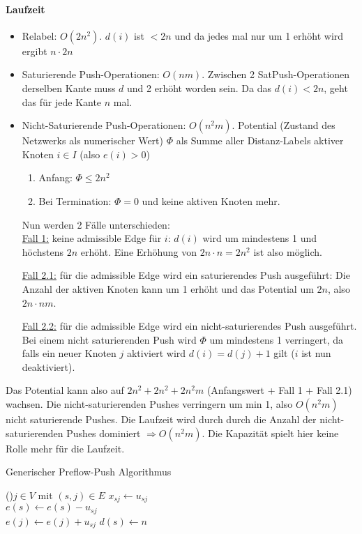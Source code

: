 \paragraph{Laufzeit}
\begin{itemize}
 \item Relabel: $O(2n^2)$. $d(i)$ ist $< 2n$ und da jedes mal nur um 1 erhöht wird ergibt $n \cdot 2n$
 \item Saturierende Push-Operationen: $O(nm)$. Zwischen 2 SatPush-Operationen derselben Kante muss $d$ und 2 erhöht worden sein. Da das $d(i) < 2n$, geht das für jede Kante $n$ mal.
 \item Nicht-Saturierende Push-Operationen: $O(n^2m)$. Potential (Zustand des Netzwerks als numerischer Wert) $\Phi$ als Summe aller Distanz-Labels aktiver Knoten $i\in I$ (also $e(i)>0$)
 \begin{enumerate}
  \item Anfang: $\Phi \leq 2n^2$
  \item Bei Termination: $\Phi = 0$ und keine aktiven Knoten mehr.
 \end{enumerate}
 Nun werden 2 Fälle unterschieden:\\
 \underline{Fall 1:} keine admissible Edge für $i$: $d(i)$ wird um mindestens 1 und höchstens $2n$ erhöht. Eine Erhöhung von $2n \cdot n = 2n^2$ ist also möglich.
 
 
 \underline{Fall 2.1:} für die admissible Edge wird ein saturierendes Push ausgeführt: Die Anzahl der aktiven Knoten kann um 1 erhöht und das Potential um $2n$, also $2n \cdot nm$.
 
 
 \underline{Fall 2.2:} für die admissible Edge wird ein nicht-saturierendes Push ausgeführt. Bei einem nicht saturierenden Push wird $\Phi$ um mindestens 1 verringert, da falls ein neuer Knoten $j$ aktiviert wird $d(i) = d(j) + 1$ gilt ($i$ ist nun deaktiviert).
 
\end{itemize}
Das Potential kann also auf $2n^2 + 2n^2 + 2n^2m$ (Anfangswert + Fall 1 + Fall 2.1) wachsen. Die nicht-saturierenden Pushes verringern um min 1, also $O(n^2m)$ nicht saturierende Pushes.
Die Laufzeit wird durch durch die Anzahl der nicht-saturierenden Pushes dominiert $\Rightarrow O(n^2m)$. Die Kapazität spielt hier keine Rolle mehr für die Laufzeit.

\begin{algorithm}
 \caption{Generischer Preflow-Push Algorithmus}
 \For(){$j\in V$ mit $(s,j) \in E$}{
    $x_{sj}\gets u_{sj}$\\
    $e(s)\gets e(s) - u_{sj}$\\
    $e(j)\gets e(j) + u_{sj}$
 }
 $d(s) \gets n$\\
 
 
 
\end{algorithm}



